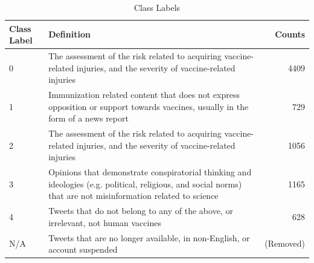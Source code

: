 \documentclass[12pt]{article}
\begin{document}
\begin{table}[tbp]
\centering
\begin{tabularx}{\linewidth}{l X r}
\toprule
Class Label & Definition & Counts\\
\midrule

0 & The assessment of the risk related to acquiring vaccine-related injuries, and the severity of vaccine-related injuries  & 4409 \\
1 & Immunization related content that does not express opposition or support towards vaccines, usually in the form of a news report  & 729 \\
2 & The assessment of the risk related to acquiring vaccine-related injuries, and the severity of vaccine-related injuries  & 1056\\
3 & Opinions that demonstrate conspiratorial thinking and ideologies (e.g. political, religious, and social norms) that are not misinformation related to science & 1165 \\ 
4 & Tweets that do not belong to any of the above, or irrelevant, not human vaccines & 628\\
N/A & Tweets that are no longer available, in non-English, or account suspended & (Removed) \\

\bottomrule
\end{tabularx}
\caption{Class Labels}
\label{tbl:class_labels}
\end{table}
\end{document}
